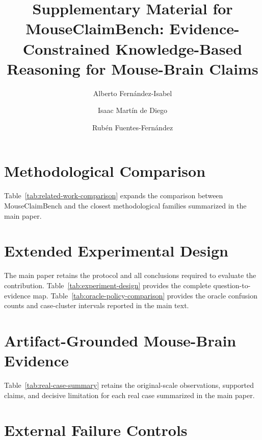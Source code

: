 \documentclass[preprint,12pt]{elsarticle}
\begin{document}
\begin{frontmatter}
\title{Supplementary Material for MouseClaimBench: Evidence-Constrained Knowledge-Based Reasoning for Mouse-Brain Claims}
\author[urjc]{Alberto Fern\'andez-Isabel}
\author[urjc]{Isaac Mart\'in de Diego}
\author[ucm]{Rub\'en Fuentes-Fern\'andez}
\end{frontmatter}
\clearpage

\section{Methodological Comparison}

Table~\ref{tab:related-work-comparison} expands the comparison between MouseClaimBench and the closest methodological families summarized in the main paper.



\section{Extended Experimental Design}

The main paper retains the protocol and all conclusions required to evaluate the contribution. Table~\ref{tab:experiment-design} provides the complete question-to-evidence map. Table~\ref{tab:oracle-policy-comparison} provides the oracle confusion counts and case-cluster intervals reported in the main text.






\section{Artifact-Grounded Mouse-Brain Evidence}

Table~\ref{tab:real-case-summary} retains the original-scale observations, supported claims, and decisive limitation for each real case summarized in the main paper.



\section{External Failure Controls}
\end{document}
